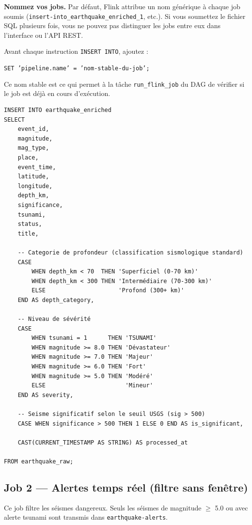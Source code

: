 \documentclass[12pt,a4paper]{article}
\begin{document}
\begin{warningbox}
  \textbf{Nommez vos jobs.}
  Par défaut, Flink attribue un nom générique à chaque job soumis
  (\texttt{insert-into\_earthquake\_enriched\_1}, etc.).
  Si vous soumettez le fichier SQL plusieurs fois, vous ne pouvez pas distinguer
  les jobs entre eux dans l'interface ou l'API REST.

  \medskip
  Avant chaque instruction \texttt{INSERT INTO}, ajoutez :
  \begin{center}
    \texttt{SET 'pipeline.name' = 'nom-stable-du-job';}
  \end{center}
  Ce nom stable est ce qui permet à la tâche \texttt{run\_flink\_job} du DAG
  de vérifier si le job est déjà en cours d'exécution.
\end{warningbox}

\begin{lstlisting}[style=sql, caption={Job 1 --- enrichissement sans fenêtre}]
INSERT INTO earthquake_enriched
SELECT
    event_id,
    magnitude,
    mag_type,
    place,
    event_time,
    latitude,
    longitude,
    depth_km,
    significance,
    tsunami,
    status,
    title,

    -- Categorie de profondeur (classification sismologique standard)
    CASE
        WHEN depth_km < 70  THEN 'Superficiel (0-70 km)'
        WHEN depth_km < 300 THEN 'Intermédiaire (70-300 km)'
        ELSE                     'Profond (300+ km)'
    END AS depth_category,

    -- Niveau de sévérité
    CASE
        WHEN tsunami = 1      THEN 'TSUNAMI'
        WHEN magnitude >= 8.0 THEN 'Dévastateur'
        WHEN magnitude >= 7.0 THEN 'Majeur'
        WHEN magnitude >= 6.0 THEN 'Fort'
        WHEN magnitude >= 5.0 THEN 'Modéré'
        ELSE                       'Mineur'
    END AS severity,

    -- Seisme significatif selon le seuil USGS (sig > 500)
    CASE WHEN significance > 500 THEN 1 ELSE 0 END AS is_significant,

    CAST(CURRENT_TIMESTAMP AS STRING) AS processed_at

FROM earthquake_raw;
\end{lstlisting}

\subsection{Job 2 --- Alertes temps réel (filtre sans fenêtre)}

Ce job filtre les séismes dangereux. Seuls les séismes de magnitude $\geq$ 5.0
ou avec alerte tsunami sont transmis dans \texttt{earthquake-alerts}.
\end{document}
